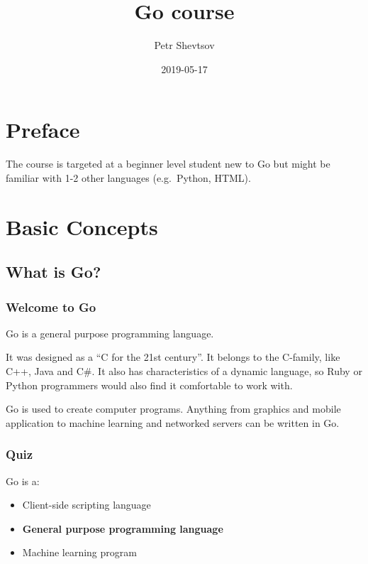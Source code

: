 \documentclass[]{book}
\title{Go course}
\author{Petr Shevtsov}
\date{2019-05-17}
\providecommand{\tightlist}{%
  \setlength{\itemsep}{0pt}\setlength{\parskip}{0pt}}
\begin{document}
\maketitle

{
\setcounter{tocdepth}{1}
\tableofcontents
}
\hypertarget{preface}{%
\chapter*{Preface}\label{preface}}

The course is targeted at a beginner level student new to Go but might be
familiar with 1-2 other languages (e.g.~Python, HTML).

\hypertarget{basic-concepts}{%
\chapter{Basic Concepts}\label{basic-concepts}}

\hypertarget{what-is-go}{%
\section{What is Go?}\label{what-is-go}}

\hypertarget{welcome-to-go}{%
\subsection{Welcome to Go}\label{welcome-to-go}}

Go is a general purpose programming language.

It was designed as a ``C for the 21st century''. It belongs to the C-family, like
C++, Java and C\#. It also has characteristics of a dynamic language, so Ruby or
Python programmers would also find it comfortable to work with.

Go is used to create computer programs. Anything from graphics and mobile
application to machine learning and networked servers can be written in Go.

\hypertarget{quiz}{%
\subsection{Quiz}\label{quiz}}

Go is a:

\begin{itemize}
\tightlist
\item
  Client-side scripting language
\item
  \textbf{General purpose programming language}
\item
  Machine learning program
\end{itemize}
\end{document}
